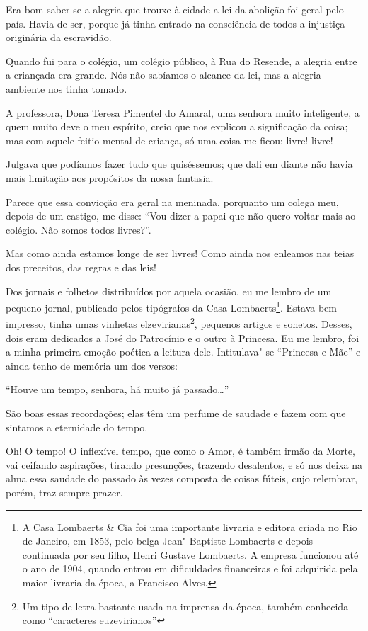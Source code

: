 Era bom saber se a alegria que trouxe à cidade a lei da abolição foi
geral pelo país. Havia de ser, porque já tinha entrado na consciência de
todos a injustiça originária da escravidão.

Quando fui para o colégio, um colégio público, à Rua do Resende, a
alegria entre a criançada era grande. Nós não sabíamos o alcance da lei,
mas a alegria ambiente nos tinha tomado.

A professora, Dona Teresa Pimentel do Amaral, uma senhora muito
inteligente, a quem muito deve o meu espírito, creio que nos explicou a
significação da coisa; mas com aquele feitio mental de criança, só uma
coisa me ficou: livre! livre!

Julgava que podíamos fazer tudo que quiséssemos; que dali em diante não
havia mais limitação aos propósitos da nossa fantasia.

Parece que essa convicção era geral na meninada, porquanto um colega
meu, depois de um castigo, me disse: ``Vou dizer a papai que não quero
voltar mais ao colégio. Não somos todos livres?''.

Mas como ainda estamos longe de ser livres! Como ainda nos enleamos nas
teias dos preceitos, das regras e das leis!

Dos jornais e folhetos distribuídos por aquela ocasião, eu me lembro de
um pequeno jornal, publicado pelos tipógrafos da Casa
Lombaerts\footnote{A Casa Lombaerts \& Cia foi uma importante livraria e
  editora criada no Rio de Janeiro, em 1853, pelo belga Jean"-Baptiste
  Lombaerts e depois continuada por seu filho, Henri Gustave Lombaerts.
  A empresa funcionou até o ano de 1904, quando entrou em dificuldades
  financeiras e foi adquirida pela maior livraria da época, a Francisco
  Alves.}. Estava bem impresso, tinha umas vinhetas
elzevirianas\footnote{Um tipo de letra bastante usada na imprensa da
  época, também conhecida como ``caracteres euzevirianos''}, pequenos
artigos e sonetos. Desses, dois eram dedicados a José do Patrocínio e o
outro à Princesa. Eu me lembro, foi a minha primeira emoção poética a
leitura dele. Intitulava"-se ``Princesa e Mãe'' e ainda tenho de memória
um dos versos:

``Houve um tempo, senhora, há muito já passado\ldots{}''

São boas essas recordações; elas têm um perfume de saudade e fazem com
que sintamos a eternidade do tempo.

Oh! O tempo! O inflexível tempo, que como o Amor, é também irmão da
Morte, vai ceifando aspirações, tirando presunções, trazendo desalentos,
e só nos deixa na alma essa saudade do passado às vezes composta de
coisas fúteis, cujo relembrar, porém, traz sempre prazer.


